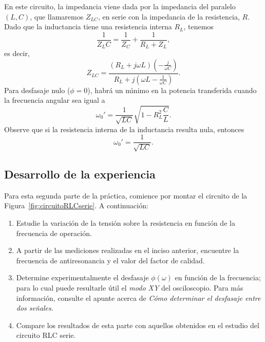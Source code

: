 \documentclass[laboratorio]{guia}
\begin{document}
En este circuito, la impedancia viene dada por la impedancia del paralelo
$(L,C)$, que llamaremos $Z_{LC}$, en serie con la impedancia de la resistencia,
$R$. Dado que la inductancia tiene una resistencia interna $R_L$, tenemos 
\begin{equation}
    \frac{1}{Z_LC} = \frac{1}{Z_C} + \frac{1}{R_L+Z_L},
\end{equation}
es decir,
\begin{equation}
    Z_{LC} = \frac{ \left( R_L + j \omega L \right) \left( -\frac{j}{\omega C}  \right)   }{R_L + j \left( \omega L - \frac{1}{\omega C}\right)}.
\end{equation}
Para desfasaje nulo ($\phi = 0$), habr\'a un m\'\i nimo en la potencia
transferida cuando la frecuencia angular sea igual a
\begin{equation}
    \omega_0' = \frac{1}{\sqrt{LC}} \sqrt{1 - R_L^2 \frac{C}{L}}.
\end{equation}
Observe que si la resistencia interna de la inductancia resulta nula, entonces
\begin{equation}
    \omega_0' = \frac{1}{\sqrt{LC}}.
\end{equation}

\subsection{Desarrollo de la experiencia}

Para esta segunda parte de la pr\'actica, comience por montar el 
circuito de la
Figura~\ref{fig:circuitoRLCserie}. A continuaci\'on:
\begin{enumerate}
    \item Estudie la variaci\'on de la tensi\'on sobre la resistencia en 
        funci\'on de la frecuencia de operaci\'on. 
    \item A partir de las mediciones realizadas en el inciso anterior,
        encuentre la frecuencia de antiresonancia y el valor del factor de
        calidad.     
    \item Determine experimentalmente el desfasaje $\phi(\omega)$ en funci\'on 
        de la frecuencia; para lo cual puede resultarle \'util el {\it modo XY}
        del osciloscopio. Para m\'as informaci\'on, consulte el apunte acerca
        de {\it C\'omo determinar el desfasaje entre dos se\~nales}.
    \item Compare los resultados de esta parte con aquellos obtenidos en el
        estudio del circuito RLC serie.
\end{enumerate}
\end{document}
